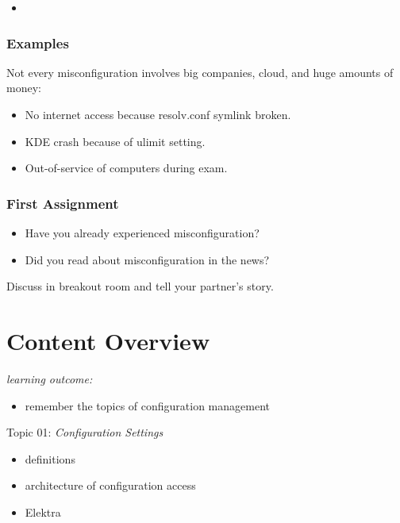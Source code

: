 {\begin{frame}
\begin{itemize}
		\item   \textcolor{white}{}
			\textcolor{white}{}
	\end{itemize}
\end{frame}
\begin{frame}
	\frametitle{Examples}
	Not every misconfiguration involves big companies, cloud, and huge amounts of money:
	\begin{itemize}
		\item No internet access because resolv.conf symlink broken.
		\item KDE crash because of ulimit setting.
		\item Out-of-service of computers during exam.
	\end{itemize}
\end{frame}
}
\begin{assignment}
	\frametitle{First Assignment}
	\begin{itemize}
		\item Have you already experienced misconfiguration?
		\item Did you read about misconfiguration in the news?
	\end{itemize}
	\begin{task}
	Discuss in breakout room and tell your partner's story.
	\end{task}
\end{assignment}

\section{Content Overview}

\begin{frame}
	\textit{learning outcome:}
	\begin{itemize}
		\item remember the topics of configuration management
	\end{itemize}
\end{frame}

\begin{frame}
	Topic 01: \textit{Configuration Settings}
	\begin{itemize}
		\item definitions
		\item architecture of configuration access
		\item Elektra
	\end{itemize}
\end{frame}

